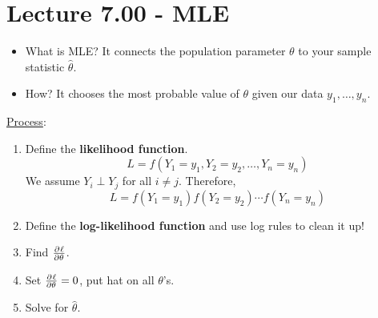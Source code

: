\section{Lecture 7.00 - MLE}
\begin{itemize}
    \item What is MLE? It connects the population parameter $ \theta $
          to your sample statistic $ \hat{\theta} $.
    \item How? It chooses the most probable value of $ \theta $
          given our data $ y_1,\ldots,y_n $.
\end{itemize}
\underline{Process}:
\begin{enumerate}[(1)]
    \item Define the \textbf{likelihood function}.
          \[ L=f(Y_1=y_1,Y_2=y_2,\ldots,Y_n=y_n) \]
          We assume $ Y_i\perp Y_j $ for all $ i\ne j $. Therefore,
          \[ L=f(Y_1=y_1)f(Y_2=y_2)\cdots f(Y_n=y_n) \]
    \item Define the \textbf{log-likelihood function} and use log rules to
          clean it up!
    \item Find $ \pd{\ell}{\theta} $.
    \item Set $ \pd{\ell}{\theta}=0 $, put hat on all $ \theta $'s.
    \item Solve for $ \hat{\theta} $.
\end{enumerate}
